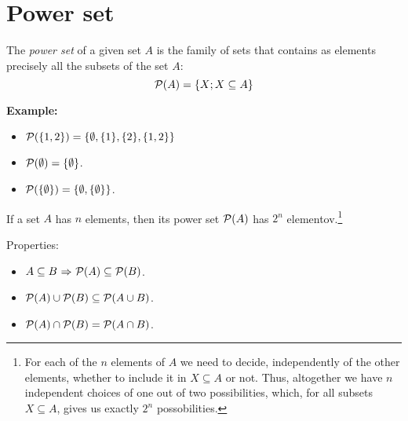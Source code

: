 \documentclass[11pt,paper=b5,footinclude,headinclude]{scrbook} %
\def\P {{\cal P}}
\def\sledi {{~\Rightarrow~}}
\def\brez {{\,\setminus\,}}
\theoremstyle{remark}
\theoremstyle{definition} %
\theoremstyle{theorem} %
\begin{document}



%
%

\section{Power set}

The {\em power set} of a given set $A$ is the family of sets that contains as elements
precisely all the subsets of the set $A$:
$${\cal P}(A) = \{X; X\subseteq A\}$$

\textbf{ Example:}
\begin{itemize}
  \item ${\cal P}(\{1,2\}) = \{\emptyset, \{1\},\{2\},\{1,2\}\}$
  \item ${\cal P}(\emptyset) = \{\emptyset\}$.
  \item ${\cal P}(\{\emptyset\}) = \{\emptyset, \{\emptyset\}\}$.
\end{itemize}

If a set $A$ has $n$ elements, then its power set ${\cal P}(A)$ has  $2^n$ elementov.\footnote{For each of the $n$ elements of $A$ we need to decide, independently of the other elements, whether to include it in $X\subseteq A$ or not. Thus, altogether we have $n$
independent choices of one out of two possibilities, which, for all subsets $X\subseteq A$, gives us exactly $2^n$ possobilities.}

\bigskip
Properties:
\begin{itemize}
  \item $A\subseteq B\sledi \P(A) \subseteq \P(B)$.
  \item $\P(A) \cup \P(B) \subseteq \P(A\cup B)$.
  \item $\P(A)\cap \P(B) =  \P(A\cap B)$.
\end{itemize}
\end{document}
